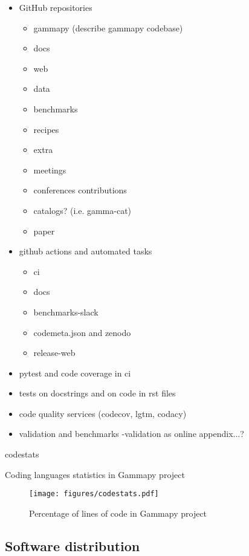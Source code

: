 \begin{itemize}
	\item GitHub repositories 
	\begin{itemize}
		\item gammapy (describe gammapy codebase)
		\item docs
		\item web
		\item data
		\item benchmarks
		\item recipes
		\item extra
		\item meetings
		\item conferences contributions
		\item catalogs? (i.e. gamma-cat)
		\item paper
	\end{itemize}
	\item github actions and automated tasks 
	\begin{itemize}
		\item ci
		\item docs
		\item benchmarks-slack
		\item codemeta.json and zenodo
		\item release-web
	\end{itemize}	
	\item pytest and code coverage in ci
	\item tests on docstrings and on code in rst files
	\item code quality services (codecov, lgtm, codacy)
	\item validation and benchmarks -validation as online appendix...?
\end{itemize}

\begin{table}
	{codestats}
	\caption{Coding languages statistics in Gammapy project}
	\label{table:codestats:data}
\end{table}

\begin{figure}[t]
	\centering
	\texttt{[image: figures/codestats.pdf]}
	\caption{
		Percentage of lines of code in Gammapy project} \label{fig:codestats:lang}
\end{figure}

\subsection{Software distribution}
\label{ssec:software-distribution}

